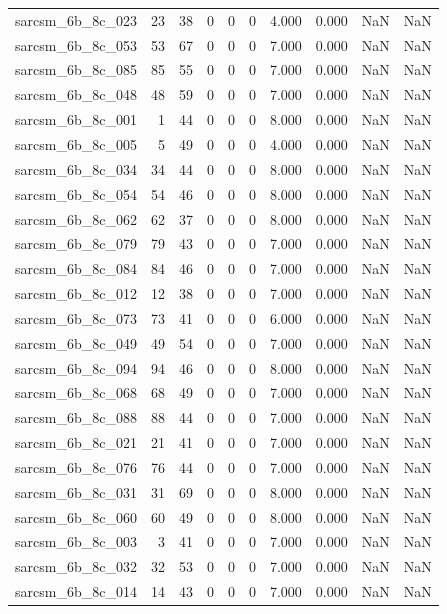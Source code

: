\documentclass{article}
\begin{document}
\begin{longtable}{lrrrrrrrrr}
sarcsm\_6b\_8c\_023 & 23 & 38 & 0 & 0 & 0 & 4.000 & 0.000 & NaN & NaN \\
sarcsm\_6b\_8c\_053 & 53 & 67 & 0 & 0 & 0 & 7.000 & 0.000 & NaN & NaN \\
sarcsm\_6b\_8c\_085 & 85 & 55 & 0 & 0 & 0 & 7.000 & 0.000 & NaN & NaN \\
sarcsm\_6b\_8c\_048 & 48 & 59 & 0 & 0 & 0 & 7.000 & 0.000 & NaN & NaN \\
sarcsm\_6b\_8c\_001 & 1 & 44 & 0 & 0 & 0 & 8.000 & 0.000 & NaN & NaN \\
sarcsm\_6b\_8c\_005 & 5 & 49 & 0 & 0 & 0 & 4.000 & 0.000 & NaN & NaN \\
sarcsm\_6b\_8c\_034 & 34 & 44 & 0 & 0 & 0 & 8.000 & 0.000 & NaN & NaN \\
sarcsm\_6b\_8c\_054 & 54 & 46 & 0 & 0 & 0 & 8.000 & 0.000 & NaN & NaN \\
sarcsm\_6b\_8c\_062 & 62 & 37 & 0 & 0 & 0 & 8.000 & 0.000 & NaN & NaN \\
sarcsm\_6b\_8c\_079 & 79 & 43 & 0 & 0 & 0 & 7.000 & 0.000 & NaN & NaN \\
sarcsm\_6b\_8c\_084 & 84 & 46 & 0 & 0 & 0 & 7.000 & 0.000 & NaN & NaN \\
sarcsm\_6b\_8c\_012 & 12 & 38 & 0 & 0 & 0 & 7.000 & 0.000 & NaN & NaN \\
sarcsm\_6b\_8c\_073 & 73 & 41 & 0 & 0 & 0 & 6.000 & 0.000 & NaN & NaN \\
sarcsm\_6b\_8c\_049 & 49 & 54 & 0 & 0 & 0 & 7.000 & 0.000 & NaN & NaN \\
sarcsm\_6b\_8c\_094 & 94 & 46 & 0 & 0 & 0 & 8.000 & 0.000 & NaN & NaN \\
sarcsm\_6b\_8c\_068 & 68 & 49 & 0 & 0 & 0 & 7.000 & 0.000 & NaN & NaN \\
sarcsm\_6b\_8c\_088 & 88 & 44 & 0 & 0 & 0 & 7.000 & 0.000 & NaN & NaN \\
sarcsm\_6b\_8c\_021 & 21 & 41 & 0 & 0 & 0 & 7.000 & 0.000 & NaN & NaN \\
sarcsm\_6b\_8c\_076 & 76 & 44 & 0 & 0 & 0 & 7.000 & 0.000 & NaN & NaN \\
sarcsm\_6b\_8c\_031 & 31 & 69 & 0 & 0 & 0 & 8.000 & 0.000 & NaN & NaN \\
sarcsm\_6b\_8c\_060 & 60 & 49 & 0 & 0 & 0 & 8.000 & 0.000 & NaN & NaN \\
sarcsm\_6b\_8c\_003 & 3 & 41 & 0 & 0 & 0 & 7.000 & 0.000 & NaN & NaN \\
sarcsm\_6b\_8c\_032 & 32 & 53 & 0 & 0 & 0 & 7.000 & 0.000 & NaN & NaN \\
sarcsm\_6b\_8c\_014 & 14 & 43 & 0 & 0 & 0 & 7.000 & 0.000 & NaN & NaN \\

\end{longtable}
\end{document}
